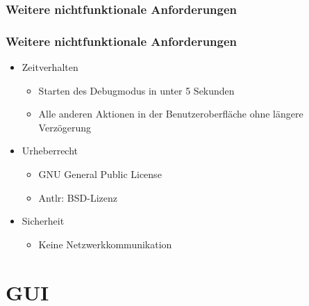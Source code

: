 \documentclass{beamer}
\begin{document}
\subsubsection{Weitere nichtfunktionale Anforderungen}
\begin{frame}
\frametitle{Weitere nichtfunktionale Anforderungen}
\begin{itemize}
\item Zeitverhalten
\begin{itemize}
\item Starten des Debugmodus in unter 5 Sekunden
\item Alle anderen Aktionen in der Benutzeroberfläche ohne längere Verzögerung
\end{itemize}
\item Urheberrecht
\begin{itemize}
\item GNU General Public License
\item Antlr: BSD-Lizenz
\end{itemize}
\item Sicherheit
\begin{itemize}
\item Keine Netzwerkkommunikation
\end{itemize}
\end{itemize}
\end{frame}



\section{GUI}
\end{document}
